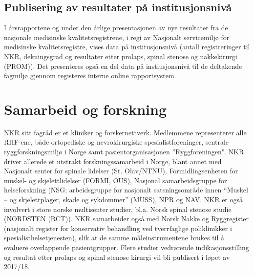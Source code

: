 \documentclass[norsk, a4paper, twocolumn]{report}
\begin{document}
\section{Publisering av resultater på institusjonsnivå}\label{sec:off}
I årsrapportene og under den årlige presentasjonen av nye resultater fra de nasjonale medisinske kvalitetsregistrene, i regi av Nasjonalt servicemiljø for medisinske kvalitetsregistre, vises data på institusjonsnivå (antall registreringer til NKR, dekningsgrad og resultater etter prolaps, spinal stenose og nakkekirurgi (PROM)). Det presenteres også en del data på instiusjonsnivå til de deltakende fagmiljø gjennom registeres interne online rapportsystem.

\chapter{Samarbeid og forskning}\label{cha:for}
NKR sitt fagråd er et kliniker og forskernettverk. Medlemmene representerer  alle RHF-ene, både ortopediske og nevrokirurgiske spesialistforeninger, sentrale ryggforskningsmiljø i Norge samt pasientorganisasjonen ''Ryggforeningen". NKR driver allerede et utstrakt forskningssamarbeid i Norge, blant annet med Nasjonalt senter for spinale lidelser (St. Olav/NTNU), Formidlingsenheten for muskel- og skjelettlidelser (FORMI, OUS), Nasjonal samarbeidsgruppe for helseforskning (NSG; arbeidsgruppe for nasjonalt satsningsområde innen ``Muskel – og skjelettplager, skade og sykdommer'' (MUSS), NPR og NAV.  NKR er også involvert i store norske multisenter studier, bl.a. Norsk spinal stenose studie (NORDSTEN (RCT)). NKR samarbeider også med Norsk Nakke og Ryggregister (nasjonalt register for konservativ behandling ved tverrfaglige poliklinikker i spesialisthelsetjenesten), slik at de samme måleinstrumentene brukes til å evaluere overlappende pasientgrupper. 
Flere studier vedrørende indikasjonsstilling og resultat etter prolaps og spinal stenose kirurgi vil bli publisert i løpet av 2017/18. 
\end{document}
